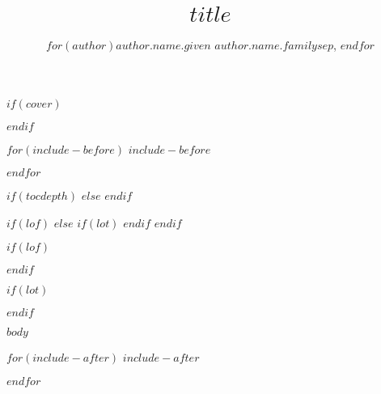 \documentclass[twoside]{extreport}
\title{$title$}
\author{
$for(author)$$author.name.given$ $author.name.family$$sep$, $endfor$
}
\begin{document}
$if(cover)$

$endif$
\maketitle
{}

$for(include-before)$
$include-before$

$endfor$


\clearpage

{}
$if(tocdepth)$
\setcounter{tocdepth}{$tocdepth$}
$else$
\setcounter{tocdepth}{1}
$endif$
\tableofcontents

$if(lof)$
\clearpage
$else$
  $if(lot)$
\clearpage
  $endif$
$endif$

$if(lof)$
{}
\listoffigures
\vspace{34pt}
$endif$

$if(lot)$
{}
\listoftables
$endif$

\clearpage


$body$

$for(include-after)$
$include-after$

$endfor$
\end{document}
